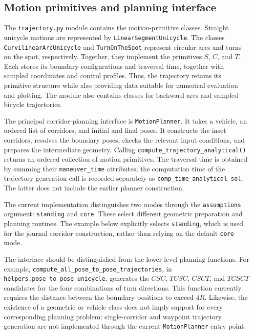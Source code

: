 \subsection{Motion primitives and planning interface}

The \texttt{trajectory.py} module contains the motion-primitive classes.
Straight unicycle motions are represented by \texttt{LinearSegmentUnicycle}.
The classes \texttt{CurvilinearArcUnicycle} and \texttt{TurnOnTheSpot}
represent circular arcs and turns on the spot, respectively. Together, they
implement the primitives $S$, $C$, and $T$. Each stores its boundary
configurations and traversal time, together with sampled coordinates and
control profiles. Thus, the trajectory retains its primitive structure while
also providing data suitable for numerical evaluation and plotting. The module
also contains classes for backward arcs and sampled bicycle trajectories.

The principal corridor-planning interface is \texttt{MotionPlanner}. It takes
a vehicle, an ordered list of corridors, and initial and final poses. It
constructs the inset corridors, resolves the boundary poses, checks the relevant
input conditions, and prepares the intermediate geometry. Calling
\texttt{compute\_trajectory\_analytical()} returns an ordered collection of
motion primitives. The traversal time is obtained by summing their
\texttt{maneuver\_time} attributes; the computation time of the trajectory
generation call is recorded separately as \texttt{comp\_time\_analytical\_sol}.
The latter does not include the earlier planner construction.

The current implementation distinguishes two modes through the
\texttt{assumptions} argument: \texttt{standing} and \texttt{core}. These select
different geometric preparation and planning routines. The example below
explicitly selects \texttt{standing}, which is used for the journal corridor
construction, rather than relying on the default \texttt{core} mode.

The interface should be distinguished from the lower-level planning functions.
For example, \texttt{compute\_all\_pose\_to\_pose\_trajectories}, in
\texttt{helpers.pose\_to\_pose\_unicycle}, generates the $CSC$, $TCSC$, $CSCT$,
and $TCSCT$ candidates for the four combinations of turn directions. This
function currently requires the distance between the boundary positions to
exceed $4R$. Likewise, the existence of a geometric or vehicle class does not
imply support for every corresponding planning problem: single-corridor and
waypoint trajectory generation are not implemented through the current
\texttt{MotionPlanner} entry point.

